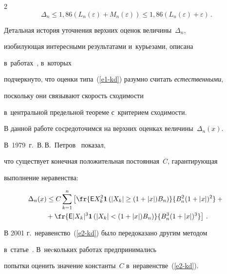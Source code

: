 \begin{multicols}{2}
\begin{equation}


\Delta_n\le 1,86\left(L_n(\varepsilon)+M_n(\varepsilon)\right)\le


1{,}86\left(L_n(\varepsilon)+\varepsilon\right)\,.


\label{e1-kd}


\end{equation}


Детальная история уточнения верхних оценок величины~$\Delta_n$,


изобилующая интересными результатами и~курьезами, описана 


в~работах~\cite{KorolevDorofeevaLMJ, Shevtsova}, в~которых


подчеркнуто, что оценки типа~(\ref{e1-kd}) разумно считать \textit{естественными}, 


поскольку они связывают скорость сходимости 


в~центральной предельной тео\-ре\-ме с~критерием схо\-ди\-мости.





В данной работе сосредоточимся на верхних оценках величины~$\Delta_n(x)$. 


В~1979~г.\ В.\,В.~Петров~\cite{Petrov1979} показал,


что существует конечная положительная постоянная~$C$, гарантирующая


выполнение неравенства:


\begin{multline}


\Delta_n(x)\le C\sum\limits_{k=1}^n \left[


\fr{{\sf E} X_k^2\mathbf{1}\left(|X_k|\ge


(1+|x|)B_n\right)}{B_n^2(1+|x|)^2}+{}\right.\\


\left.{}+\fr{{\sf E}


|X_k|^3\mathbf{1}\left(|X_k|<(1+|x|)B_n\right)}{B_n^3(1+|x|)^3}\right]\,.


\label{e2-kd}


\end{multline}


В 2001 г.\ неравенство~(\ref{e2-kd}) было передоказано другим методом 


в~статье~\cite{ChenShao2001}. В~неcкольких работах предпринимались


попытки оценить значение константы~$C$ в~неравенстве~(\ref{e2-kd}). 



\end{multicols}
